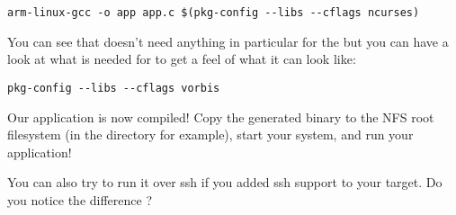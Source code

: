 \begin{verbatim}
arm-linux-gcc -o app app.c $(pkg-config --libs --cflags ncurses)
\end{verbatim}

You can see that  doesn't need anything in particular for the
 but you can have a look at what is needed for
 to get a feel of what it can look like:

\begin{verbatim}
pkg-config --libs --cflags vorbis
\end{verbatim}

Our application is now compiled! Copy the generated binary to the NFS
root filesystem (in the  directory for example), start
your system, and run your application!

You can also try to run it over ssh if you added ssh support to your
target. Do you notice the difference ?
